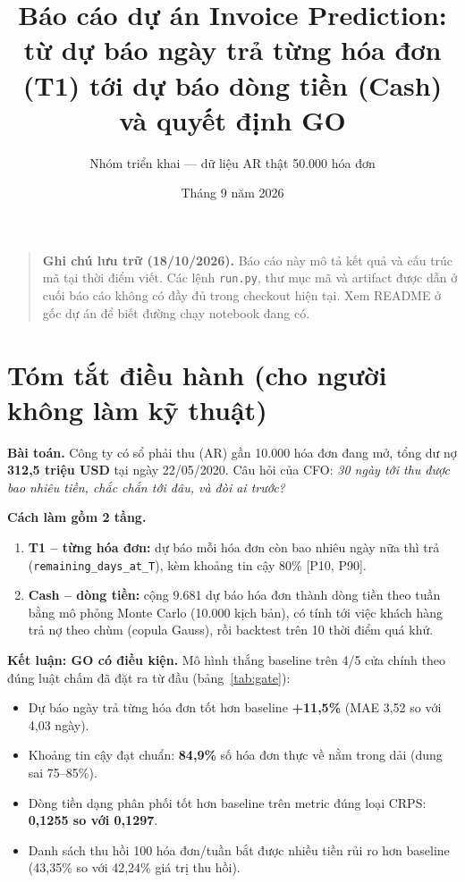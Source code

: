 \documentclass[12pt,a4paper]{article}
\title{Báo cáo dự án Invoice Prediction:\\từ dự báo ngày trả từng hóa đơn (T1) tới dự báo dòng tiền (Cash) và quyết định GO}
\author{Nhóm triển khai --- dữ liệu AR thật 50.000 hóa đơn}
\date{Tháng 9 năm 2026}
\begin{document}
\maketitle

\begin{quote}
\textbf{Ghi chú lưu trữ (18/10/2026).} Báo cáo này mô tả kết quả và cấu trúc mã tại thời điểm viết. Các lệnh \texttt{run.py}, thư mục mã và artifact được dẫn ở cuối báo cáo không có đầy đủ trong checkout hiện tại. Xem README ở gốc dự án để biết đường chạy notebook đang có.
\end{quote}
\tableofcontents
\newpage

\section{Tóm tắt điều hành (cho người không làm kỹ thuật)}
\label{sec:summary}

\textbf{Bài toán.} Công ty có sổ phải thu (AR) gần 10.000 hóa đơn đang mở, tổng dư nợ
\textbf{312,5 triệu USD} tại ngày 22/05/2020. Câu hỏi của CFO: \textit{30 ngày tới thu được bao nhiêu tiền, chắc chắn tới đâu, và đòi ai trước?}

\textbf{Cách làm gồm 2 tầng.}
\begin{enumerate}
\item \textbf{T1 -- từng hóa đơn:} dự báo mỗi hóa đơn còn bao nhiêu ngày nữa thì trả
(\texttt{remaining\_days\_at\_T}), kèm khoảng tin cậy 80\% [P10, P90].
\item \textbf{Cash -- dòng tiền:} cộng 9.681 dự báo hóa đơn thành dòng tiền theo tuần bằng
mô phỏng Monte Carlo (10.000 kịch bản), có tính tới việc khách hàng trả nợ theo chùm
(copula Gauss), rồi backtest trên 10 thời điểm quá khứ.
\end{enumerate}

\textbf{Kết luận: GO có điều kiện.} Mô hình thắng baseline trên 4/5 cửa chính theo đúng luật
chấm đã đặt ra từ đầu (bảng~\ref{tab:gate}):
\begin{itemize}
\item Dự báo ngày trả từng hóa đơn tốt hơn baseline \textbf{+11,5\%} (MAE 3,52 so với 4,03 ngày).
\item Khoảng tin cậy đạt chuẩn: \textbf{84,9\%} số hóa đơn thực về nằm trong dải (dung sai 75--85\%).
\item Dòng tiền dạng phân phối tốt hơn baseline trên metric đúng loại CRPS:
\textbf{0,1255 so với 0,1297}.
\item Danh sách thu hồi 100 hóa đơn/tuần bắt được nhiều tiền rủi ro hơn baseline
(43,35\% so với 42,24\% giá trị thu hồi).
\end{itemize}
\end{document}
